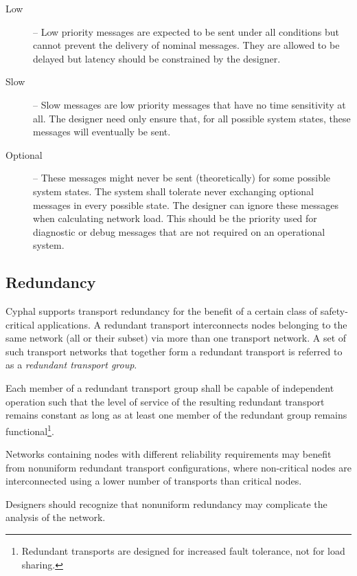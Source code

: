 \begin{remark}[breakable]
\begin{description}
        \item[Low] -- Low priority messages are expected to be sent under all conditions but cannot
        prevent the delivery of nominal messages.
        They are allowed to be delayed but latency should be constrained by the designer.

        \item[Slow] -- Slow messages are low priority messages that have no time sensitivity at all.
        The designer need only ensure that, for all possible system states,
        these messages will eventually be sent.

        \item[Optional] -- These messages might never be sent (theoretically) for some possible system states.
        The system shall tolerate never exchanging optional messages in every possible state.
        The designer can ignore these messages when calculating network load.
        This should be the priority used for diagnostic or debug messages that are not required on an
        operational system.
    \end{description}
\end{remark}

\subsection{Redundancy}

Cyphal supports transport redundancy for the benefit of a certain class of safety-critical applications.
A redundant transport interconnects nodes belonging to the same network (all or their subset)
via more than one transport network.
A set of such transport networks that together form a redundant transport is referred to as a
\emph{redundant transport group}.

Each member of a redundant transport group shall be capable of independent operation
such that the level of service of the resulting redundant transport remains constant
as long as at least one member of the redundant group remains functional\footnote{%
    Redundant transports are designed for increased fault tolerance, not for load sharing.
}.

\begin{remark}
    Networks containing nodes with different reliability requirements may benefit from
    nonuniform redundant transport configurations, where non-critical nodes are interconnected
    using a lower number of transports than critical nodes.

    Designers should recognize that nonuniform redundancy may complicate the analysis of the network.
\end{remark}

